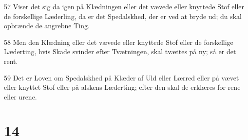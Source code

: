 \par 57 Viser det sig da igen på Klædningen eller det vævede eller knyttede Stof eller de forskellige Læderling, da er det Spedalskhed, der er ved at bryde ud; du skal opbrænde de angrebne Ting.
\par 58 Men den Klædning eller det vævede eller knyttede Stof eller de forskellige Læderting, hvis Skade svinder efter Tvætningen, skal tvættes på ny; så er det rent.
\par 59 Det er Loven om Spedalskhed på Klæder af Uld eller Lærred eller på vævet eller knyttet Stof eller på alskens Læderting; efter den skal de erklæres for rene eller urene.

\chapter{14}

